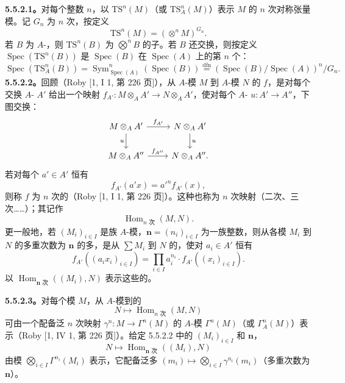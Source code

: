 \textbf{5.5.2.1。}对每个整数 $n$，以 $\mathrm{TS}^n(M)$（或 $\mathrm{TS}^n_A(M)$）表示 $M$ 的 $n$ 次对称张量模。记 $G_n$ 为 $n$ 次，按定义
\[\mathrm{TS}^n(M)=(\mathop{\otimes}\nolimits^n M)^{G_n}.\]
若 $B$ 为 $A$-，则 $\mathrm{TS}^n(B)$ 为 $\bigotimes^n B$ 的子。若 $B$ 还交换，则按定义 $\operatorname{Spec}(\mathrm{TS}^n(B))$ 是 $\operatorname{Spec}(B)$ 在 $\operatorname{Spec}(A)$ 上的第 $n$ 个：
\[\operatorname{Spec}(\mathrm{TS}^n_A(B))=\operatorname{Sym}^n_{\operatorname{Spec}(A)}(\operatorname{Spec}(B))\overset{\mathrm{dfn}}=(\operatorname{Spec}(B)/\operatorname{Spec}(A))^n/G_n.\]
\textbf{5.5.2.2。}回顾（Roby [1, I 1, 第 226 页]），从 $A$-模 $M$ 到 $A$-模 $N$ 的 $f$，是对每个交换 $A$- $A'$ 给出一个映射 $f_{A'}:M\otimes_A A'\to N\otimes_A A'$，使对每个 $A$- $u:A'\to A''$，下图交换：
\[\begin{tikzcd}
M\otimes_A A'\arrow[r,"f_{A'}"]\arrow[d,"u"']&N\otimes_A A'\arrow[d,"u"]\\
M\otimes_A A''\arrow[r,"f_{A''}"]&N\otimes_A A'' .
\end{tikzcd}\]
若对每个 $a'\in A'$ 恒有
\[f_{A'}(a'x)=a'^n f_{A'}(x),\]
则称 $f$ 为 $n$ 次的（Roby [1, I 1, 第 226 页]）。这种也称为 $n$ 次映射（二次、三次……）；其记作
\[\operatorname{Hom}_{n\text{ 次}}(M,N).\]
更一般地，若 $(M_i)_{i\in I}$ 是族 $A$-模，$\mathbf n=(n_i)_{i\in I}$ 为一族整数，则从各模 $M_i$ 到 $N$ 的多重次数为 $\mathbf n$ 的多，是从 $\sum M_i$ 到 $N$ 的，使对 $a_i\in A'$ 恒有
\[f_{A'}((a_ix_i)_{i\in I})=\prod_{i\in I}a_i^{n_i}\cdot f_{A'}((x_i)_{i\in I}).\]
以 $\operatorname{Hom}_{\mathbf n\text{ 次}}((M_i),N)$ 表示这些的。

\textbf{5.5.2.3。}对每个模 $M$，从 $A$-模到的
\[N\longmapsto\operatorname{Hom}_{n\text{ 次}}(M,N)\]
可由一个配备泛 $n$ 次映射 $\gamma^n:M\to\Gamma^n(M)$ 的 $A$-模 $\Gamma^n(M)$（或 $\Gamma^n_A(M)$）表示（Roby [1, IV 1, 第 226 页]）。给定 5.5.2.2 中的 $(M_i)_{i\in I}$ 和 $\mathbf n$，
\[N\longmapsto\operatorname{Hom}_{\mathbf n\text{ 次}}((M_i),N)\]
由模 $\bigotimes_{i\in I}\Gamma^{n_i}(M_i)$ 表示，它配备泛多 $(m_i)\mapsto\bigotimes_{i\in I}\gamma^{n_i}(m_i)$（多重次数为 $\mathbf n$）。

